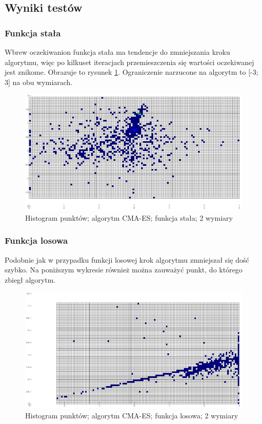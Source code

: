 \documentclass{mini}
\begin{document}
\subsection{Wyniki testów}

\subsubsection*{Funkcja stała}
Wbrew oczekiwanion funkcja stała ma tendencje do zmniejszania kroku algorytmu, więc po kilkuset iteracjach przemieszczenia się wartości oczekiwanej jest znikome. Obrazuje to rysunek \ref{cmaes:const}. Ograniczenie narzucone na algorytm to [-3; 3] na obu wymiarach.

\begin{figure}[H]
\centering
\includegraphics[width=\textwidth]{cmaes-const-boundaries-dim2-start0_0}
\caption{Histogram punktów; algorytm CMA-ES; funkcja stała; 2 wymiary}
\label{cmaes:const}
\end{figure}

\subsubsection*{Funkcja losowa}
Podobnie jak w przypadku funkcji losowej krok algorytmu zmniejszał się dość szybko. Na poniższym wykresie również można zauważyć punkt, do którego zbiegł algorytm.

\begin{figure}[H]
\centering
\includegraphics[width=\textwidth]{cmaes-rand-boundaries-dim2-start0_0}
\caption{Histogram punktów; algorytm CMA-ES; funkcja losowa; 2 wymiary}
\end{figure}
\end{document}
